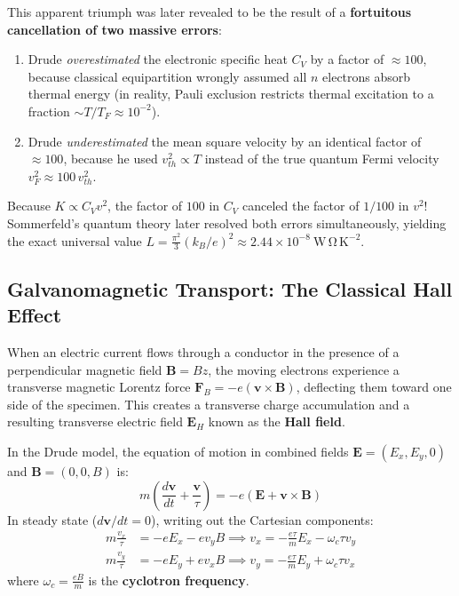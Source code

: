 \documentclass[11pt,a4paper]{article}
\newcommand{\vb}[1]{\mathbf{#1}}
\begin{document}
This apparent triumph was later revealed to be the result of a \textbf{fortuitous cancellation of two massive errors}:
\begin{enumerate}
    \item Drude \emph{overestimated} the electronic specific heat $C_V$ by a factor of $\approx 100$, because classical equipartition wrongly assumed all $n$ electrons absorb thermal energy (in reality, Pauli exclusion restricts thermal excitation to a fraction $\sim T/T_F \approx 10^{-2}$).
    \item Drude \emph{underestimated} the mean square velocity by an identical factor of $\approx 100$, because he used $v_{th}^2 \propto T$ instead of the true quantum Fermi velocity $v_F^2 \approx 100\, v_{th}^2$.
\end{enumerate}
Because $K \propto C_V v^2$, the factor of $100$ in $C_V$ canceled the factor of $1/100$ in $v^2$! Sommerfeld's quantum theory later resolved both errors simultaneously, yielding the exact universal value $L = \frac{\pi^2}{3}(k_B/e)^2 \approx 2.44 \times 10^{-8}\ \mathrm{W\,\Omega\,K^{-2}}$.

\subsection{Galvanomagnetic Transport: The Classical Hall Effect}
When an electric current flows through a conductor in the presence of a perpendicular magnetic field $\vb{B} = B\hat{z}$, the moving electrons experience a transverse magnetic Lorentz force $\vb{F}_B = -e(\vb{v}\times\vb{B})$, deflecting them toward one side of the specimen. This creates a transverse charge accumulation and a resulting transverse electric field $\vb{E}_H$ known as the \textbf{Hall field}.

In the Drude model, the equation of motion in combined fields $\vb{E} = (E_x, E_y, 0)$ and $\vb{B} = (0, 0, B)$ is:
\begin{equation}
m\left( \frac{d\vb{v}}{dt} + \frac{\vb{v}}{\tau} \right) = -e(\vb{E} + \vb{v}\times\vb{B})
\end{equation}
In steady state ($d\vb{v}/dt = 0$), writing out the Cartesian components:
\begin{align}
m\frac{v_x}{\tau} &= -e E_x - e v_y B \implies v_x = -\frac{e\tau}{m}E_x - \omega_c\tau v_y \label{eq:hall_vx} \\
m\frac{v_y}{\tau} &= -e E_y + e v_x B \implies v_y = -\frac{e\tau}{m}E_y + \omega_c\tau v_x \label{eq:hall_vy}
\end{align}
where $\omega_c = \frac{eB}{m}$ is the \textbf{cyclotron frequency}.
\end{document}
